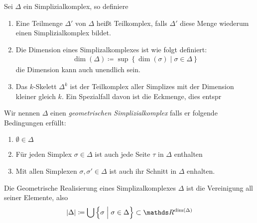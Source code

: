 
\begin{Def}
  Sei $\Delta$ ein Simplizialkomplex, so definiere
  \begin{enumerate}[1)]
  \item Eine Teilmenge $\Delta'$ von $\Delta$ heißt Teilkomplex, falls
    $\Delta'$ diese Menge wiederum einen Simplizialkomplex bildet.
  \item Die Dimension eines Simplizalkomplexes ist wie folgt
    definiert:
    \begin{gather*}
      \dim(\Delta) \coloneqq \sup \left\{ \dim(\sigma) \; \Big| \;
        \sigma \in \Delta \right\}
    \end{gather*}
    die Dimension kann auch unendlich sein.
  \item Das $k$-Skelett $\Delta^k$ ist der Teilkomplex aller Simplizes
    mit der Dimension kleiner gleich $k$.  Ein Spezialfall davon ist
    die Eckmenge, dies entspr
  \end{enumerate}
\end{Def}


\begin{Def}
  Wir nennen $\Delta$ einen \textit{geometrischen Simplizialkomplex}
  falls er folgende Bedingungen erfüllt:
  \begin{enumerate}[(K1)]
  \item $\emptyset \in \Delta$
  \item Für jeden Simplex $\sigma \in \Delta$ ist auch jede Seite
    $\tau$ in $\Delta$ enthalten
  \item Mit allen Simplexen $\sigma, \sigma' \in \Delta$ ist auch ihr
    Schnitt in $\Delta$ enhalten.
  \end{enumerate}
\end{Def}



\begin{Def}
  Die Geometrische Realisierung eines Simplizalkomplexes $\Delta$ ist
  die Vereinigung all seiner Elemente, also
  \begin{gather*}
    |\Delta| \coloneqq \bigcup \left\{ \sigma \; \Big| \; \sigma \in
      \Delta \right\} \subset \R^{\dim(\Delta)}
  \end{gather*}
\end{Def}

